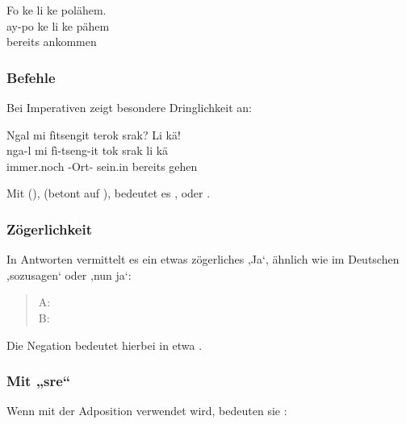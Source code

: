 \begin{interlin}
	\glll Fo ke li ke polähem. \\
	ay-po ke li ke pähem \\
	  bereits  ankommen \\
\end{interlin}

\subsubsection{Befehle} Bei Imperativen zeigt  besondere Dringlichkeit an: 

\begin{interlin}
	\glll \Npawl{}Ngal mi fìtsengit terok srak? Li kä! \\
	nga-l mi fì-tseng-it tok srak li kä \\
	 immer.noch -Ort- sein.in  bereits gehen \\
\end{interlin}

Mit  (),  (betont auf ), bedeutet es , oder .

\subsubsection{Zögerlichkeit} In Antworten vermittelt es ein etwas zögerliches ,Ja‘, ähnlich wie im Deutschen ,sozusagen‘ oder ,nun ja‘:

\begin{quotation}
	\noindent A:  \\
	\noindent B:  
\end{quotation}

\noindent Die Negation  bedeutet hierbei in etwa . 

\subsubsection{Mit „sre“} Wenn  mit der Adposition  verwendet wird, bedeuten sie :\label{syn:li:sre}


